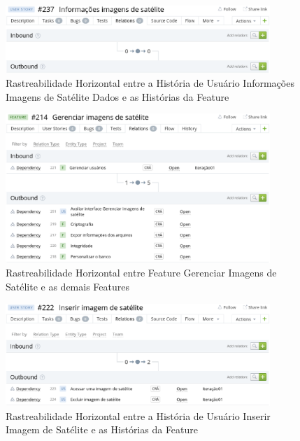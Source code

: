     \begin{figure}[!htb]
    \centering
    \includegraphics[width=10cm, keepaspectratio=false]{figuras/rastreabilidade/horizontal/expor_info/historia_info_imagem.eps}
    \caption{Rastreabilidade Horizontal entre a História de Usuário Informações Imagens de Satélite Dados e as Histórias da Feature}
  \end{figure}


  \begin{figure}[!htb]
    \centering
    \includegraphics[width=10cm, keepaspectratio=false]{figuras/rastreabilidade/horizontal/gerenciar_imagens/feature_gerenciar_imagem.eps}
    \caption{Rastreabilidade Horizontal entre Feature Gerenciar Imagens de Satélite e as demais Features}
  \end{figure}

    \begin{figure}[!htb]
    \centering
    \includegraphics[width=10cm, keepaspectratio=false]{figuras/rastreabilidade/horizontal/gerenciar_imagens/historia_inserir_imgagem.eps}
    \caption{Rastreabilidade Horizontal entre a História de Usuário Inserir Imagem de Satélite e as Histórias da Feature}
  \end{figure}

